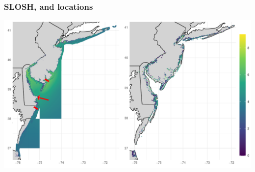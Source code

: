 \documentclass[aspectratio=169,10pt]{beamer}
\newlength{\frametextheight}
\begin{document}
\begin{frame}
    \frametitle{SLOSH, and locations}
    \begin{center}
    \includegraphics[height=\frametextheight]{./ch3/plots/slosh_combined}
    \end{center}
\end{frame} %
\end{document}
